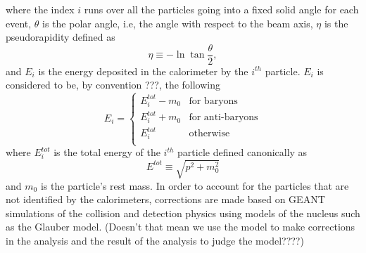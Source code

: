 where the index $i$ runs over all the particles going into a fixed solid angle for each event, $\theta$ is the polar angle, i.e, the angle with respect to the beam axis, $\eta$ is the pseudorapidity defined as 
\begin{equation}\label{eqn:pseudorap}
\eta\equiv-\ln\tan{\frac{\theta}{2}},
\end{equation}
and $E_{i}$ is the energy deposited in the calorimeter by the $i^{th}$ particle. $E_{i}$ is considered to be, by convention \cite{PhysRevC.89.044905}???, the following
\begin{equation}\label{eqn:EiCaseByCase}
E_{i} = 
	\begin{cases}
	E_{i}^{tot}-m_{0} & \text{for baryons} \\
	E_{i}^{tot}+m_{0} & \text{for anti-baryons} \\	
	E_{i}^{tot} & \text{otherwise} \\
	\end{cases}
\end{equation}
where $E_{i}^{tot}$ is the total energy of the $i^{th}$ particle defined canonically as
\begin{equation}\label{eqn:Etot}
E^{tot}\equiv\sqrt{p^{2}+m_{0}^2}
\end{equation}
and  $m_{0}$ is the particle's rest mass.
In order to account for the particles that are not identified by the calorimeters, corrections are made based on GEANT simulations of the collision and detection physics using models of the nucleus such as the Glauber model. (Doesn't that mean we use the model to make corrections in the analysis and the result of the analysis to judge the model????)

